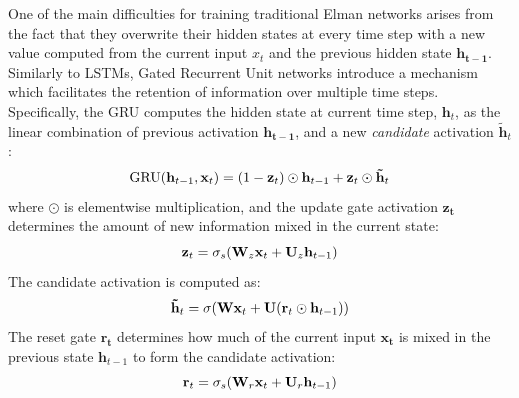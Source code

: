 One of the main difficulties for training traditional Elman networks
arises from the fact that they overwrite their hidden states at every
time step with a new value computed from the current input $x_{t}$ and
the previous hidden state $\mathbf{h_{t-1}}$. Similarly to LSTMs,
Gated Recurrent Unit networks introduce a mechanism which facilitates the retention of 
information over multiple time steps.
Specifically, the GRU computes the hidden state at current time step, $\mathbf{h}_{t}$, as the
linear combination of previous activation $\mathbf{h_{t-1}}$, and a new
{\it candidate} activation $\mathbf{\tilde{h}}_t$:
%
\vspace{-.2cm}
\begin{equation}
  \mathrm{GRU}(\mathbf{h}_{t-1}, \mathbf{x}_t) = (1 - \mathbf{z}_t)\odot \mathbf{h}_{t-1} + \mathbf{z}_t \odot \mathbf{\tilde{h}}_t
\vspace{-.1cm}
\end{equation}
%
where $\odot$ is elementwise multiplication, and the update gate
activation $\mathbf{z_{t}}$ determines the amount of new information
mixed in the current state:
%
\vspace{-.1cm}
\begin{equation}
\label{eq:gru-update}
   \mathbf{z}_t = \sigma_s(\mathbf{W}_z \mathbf{x}_t + \mathbf{U}_z \mathbf{h}_{t-1})
\vspace{-.1cm}
\end{equation}
%
The candidate activation is computed as:
%
\vspace{-.2cm}
\begin{equation}
\label{eq:gru-cand}
   \mathbf{\tilde{h}}_t = \sigma(\mathbf{W} \mathbf{x}_t + \mathbf{U}(\mathbf{r}_t \odot \mathbf{h}_{t-1}))
\vspace{-.1cm}
\end{equation}
%
The reset gate $\mathbf{r_{t}}$ determines how much of the current
input $\mathbf{x_{t}}$ is mixed in the previous state
$\mathbf{h}_{t-1}$ to form the candidate activation:
%
\vspace{-.2cm}
\begin{equation}
\label{eq:gru-reset}
   \mathbf{r}_t = \sigma_s(\mathbf{W}_r \mathbf{x}_t + \mathbf{U}_r \mathbf{h}_{t-1})
\vspace{-.1cm}
\end{equation}


